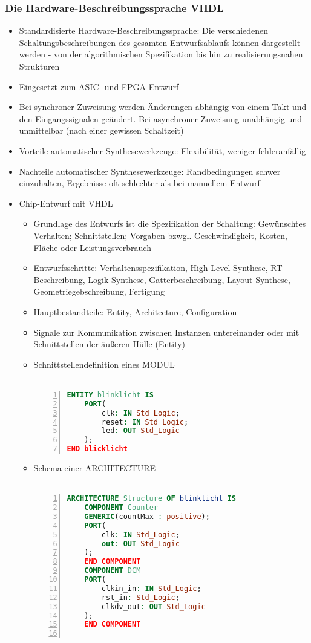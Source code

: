 \subsubsection{Die Hardware-Beschreibungssprache VHDL}
\begin{itemize}
	\item Standardisierte Hardware-Beschreibungssprache: Die verschiedenen Schaltungsbeschreibungen des gesamten Entwurfsablaufs können dargestellt werden - von der algorithmischen Spezifikation bis hin zu realisierungsnahen Strukturen
	\item Eingesetzt zum ASIC- und FPGA-Entwurf
	\item Bei synchroner Zuweisung werden Änderungen abhängig von einem Takt und den Eingangssignalen geändert. Bei asynchroner Zuweisung unabhängig und unmittelbar (nach einer gewissen Schaltzeit)
	\item Vorteile automatischer Synthesewerkzeuge: Flexibilität, weniger fehleranfällig
	\item Nachteile automatischer Synthesewerkzeuge: Randbedingungen schwer einzuhalten, Ergebnisse oft schlechter als bei manuellem Entwurf
	\item Chip-Entwurf mit VHDL
	\begin{itemize}
		\item Grundlage des Entwurfs ist die Spezifikation der Schaltung: Gewünschtes Verhalten; Schnittstellen; Vorgaben bzwgl. Geschwindigkeit, Kosten, Fläche oder Leistungsverbrauch
		\item Entwurfsschritte: Verhaltensspezifikation, High-Level-Synthese, RT-Beschreibung, Logik-Synthese, Gatterbeschreibung, Layout-Synthese, Geometriegebschreibung, Fertigung
		\item Hauptbestandteile: Entity, Architecture, Configuration
		\item Signale zur Kommunikation zwischen Instanzen untereinander oder mit Schnittstellen der äußeren Hülle (Entity)
		\item Schnittstellendefinition eines MODUL\\\\
			\begin{minipage}{\linewidth}
			\begin{lstlisting}[frame=single,numbers=left,mathescape,language=VHDL,tabsize=4]
ENTITY blinklicht IS
	PORT(
		clk: IN Std_Logic;
		reset: IN Std_Logic;
		led: OUT Std_Logic
	);
END blicklicht
			\end{lstlisting}
			\end{minipage}
		\item Schema einer ARCHITECTURE\\\\
			\begin{minipage}{\linewidth}
			\begin{lstlisting}[frame=single,numbers=left,mathescape,language=VHDL,tabsize=4]
ARCHITECTURE Structure OF blinklicht IS
	COMPONENT Counter
	GENERIC(countMax : positive);
	PORT(
		clk: IN Std_Logic;
		out: OUT Std_Logic
	);
	END COMPONENT
	COMPONENT DCM
	PORT(
		clkin_in: IN Std_Logic;
		rst_in: Std_Logic;
		clkdv_out: OUT Std_Logic
	);
	END COMPONENT


\end{lstlisting}
\end{minipage}
\end{itemize}
\end{itemize}
